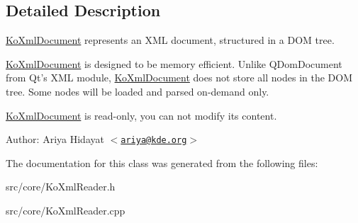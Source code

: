 \subsection{Detailed Description}
\hyperlink{classKoXmlDocument}{KoXmlDocument} represents an XML document, structured in a DOM tree.

\hyperlink{classKoXmlDocument}{KoXmlDocument} is designed to be memory efficient. Unlike QDomDocument from Qt's XML module, \hyperlink{classKoXmlDocument}{KoXmlDocument} does not store all nodes in the DOM tree. Some nodes will be loaded and parsed on-demand only.

\hyperlink{classKoXmlDocument}{KoXmlDocument} is read-only, you can not modify its content.

\begin{Desc}
\item[Author:]Ariya Hidayat $<$\href{mailto:ariya@kde.org}{\tt ariya@kde.org}$>$ \end{Desc}


The documentation for this class was generated from the following files:\begin{CompactItemize}
\item 
src/core/KoXmlReader.h\item 
src/core/KoXmlReader.cpp\end{CompactItemize}
